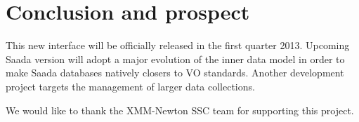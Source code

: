 \documentclass[11pt,twoside]{article}
\begin{document}
\section {Conclusion and prospect}
This new interface will be officially released in the first quarter 2013.
Upcoming Saada version will adopt a major evolution of the inner data model in order to make Saada databases natively closers to VO standards. Another development project targets the management of larger data collections.

\acknowledgements We would like to thank the XMM-Newton SSC team for supporting this project.



\end{document}
